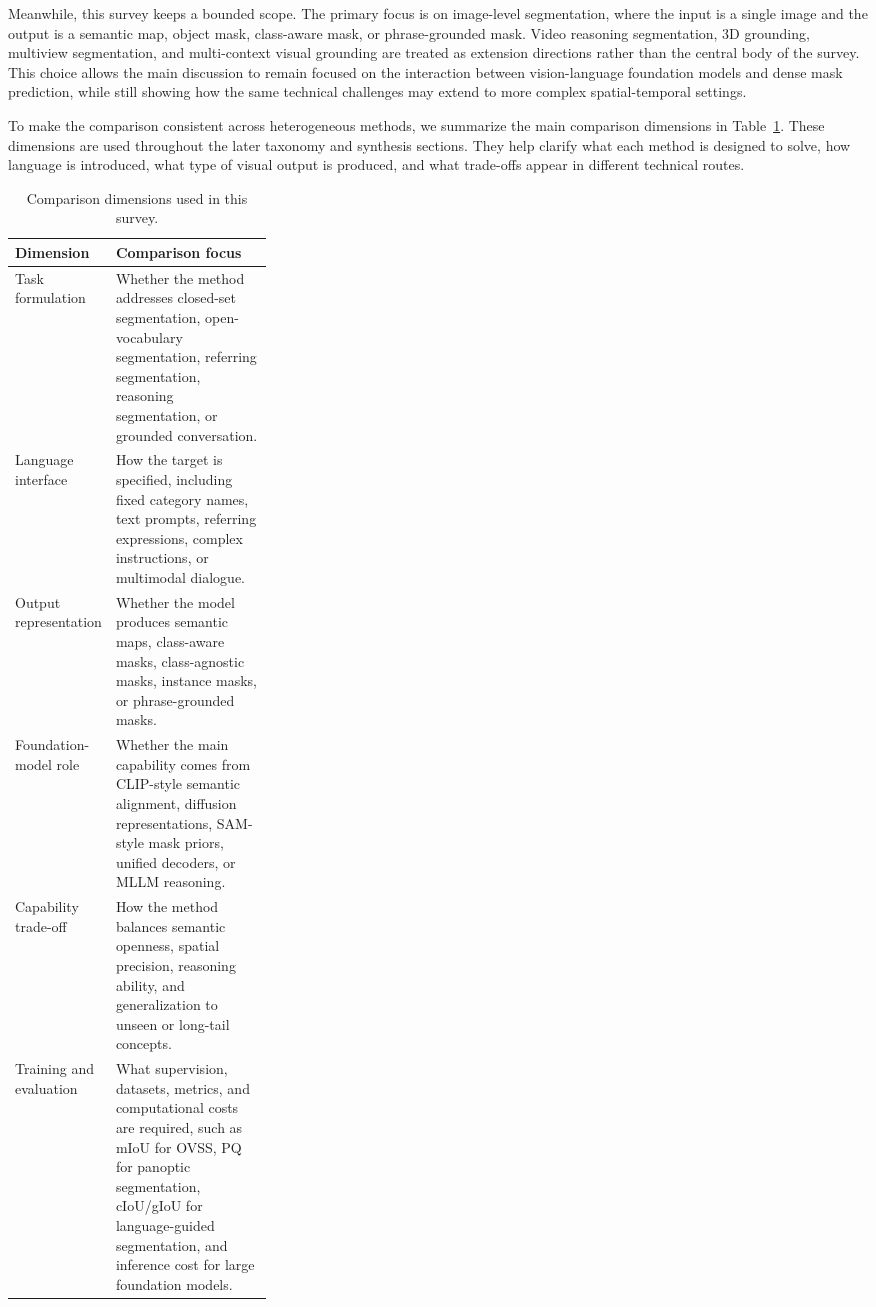 Meanwhile, this survey keeps a bounded scope. 
The primary focus is on image-level segmentation, where the input is a single image and the output is a semantic map, object mask, class-aware mask, or phrase-grounded mask. 
Video reasoning segmentation, 3D grounding, multiview segmentation, and multi-context visual grounding are treated as extension directions rather than the central body of the survey. 
This choice allows the main discussion to remain focused on the interaction between vision-language foundation models and dense mask prediction, while still showing how the same technical challenges may extend to more complex spatial-temporal settings.

To make the comparison consistent across heterogeneous methods, we summarize the main comparison dimensions in Table~\ref{tab:comparison_dimensions}. 
These dimensions are used throughout the later taxonomy and synthesis sections. 
They help clarify what each method is designed to solve, how language is introduced, what type of visual output is produced, and what trade-offs appear in different technical routes.

\begin{table}[!htbp]
\centering
\footnotesize
\caption{Comparison dimensions used in this survey.}
\label{tab:comparison_dimensions}
\begin{tabularx}{\linewidth}{p{0.3\linewidth} X}
\hline
\textbf{Dimension} & \textbf{Comparison focus} \\
\hline
Task formulation 
& Whether the method addresses closed-set segmentation, open-vocabulary segmentation, referring segmentation, reasoning segmentation, or grounded conversation. \\

Language interface 
& How the target is specified, including fixed category names, text prompts, referring expressions, complex instructions, or multimodal dialogue. \\

Output representation 
& Whether the model produces semantic maps, class-aware masks, class-agnostic masks, instance masks, or phrase-grounded masks. \\

Foundation-model role 
& Whether the main capability comes from CLIP-style semantic alignment, diffusion representations, SAM-style mask priors, unified decoders, or MLLM reasoning. \\

Capability trade-off 
& How the method balances semantic openness, spatial precision, reasoning ability, and generalization to unseen or long-tail concepts. \\

Training and evaluation 
& What supervision, datasets, metrics, and computational costs are required, such as mIoU for OVSS, PQ for panoptic segmentation, cIoU/gIoU for language-guided segmentation, and inference cost for large foundation models. \\
\hline
\end{tabularx}
\end{table}


